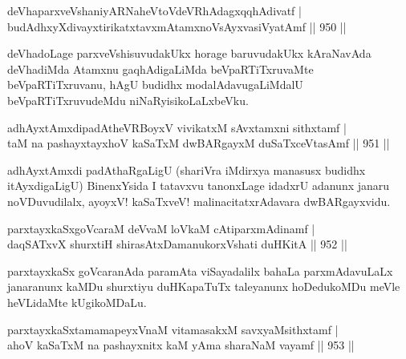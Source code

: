 
\begin{shl}
deVhaparxveVshaniyARNaheVtoVdeVRhAda\footnotemark[1]gxqqhAdivatf | \\
budAdhxyXdivayxtirikatxtavxmAtamxnoV\s sAyxvasiVyatAmf \hfill||  950 ||  
\end{shl}

\begin{artha}
deVhadoLage parxveVshisuvudakUkx horage baruvudakUkx  kAraNavAda deVhadiMda Atamxnu gaqhAdigaLiMda beVpaRTiTxruvaMte beVpaRTiTxruvanu, hAgU budidhx modalAdavugaLiMdalU beVpaRTiTxruvudeMdu niNaRyisikoLaLxbeVku.
\end{artha}


\begin{shl}
adhAyxtAmxdipadAtheVRBoyxV vivikatxM sAvxtamxni sithxtamf | \\
taM na pashayxtayxhoV kaSaTxM dwBARgayxM duSaTxceVtasAmf \hfill||  951 ||  
\end{shl}

\begin{artha}
adhAyxtAmxdi padAthaRgaLigU (shariVra iMdirxya manasusx budidhx itAyxdigaLigU) BinenxYsida I tatavxvu tanonxLage idadxrU adanunx janaru noVDuvudilalx, ayoyxV! kaSaTxveV! malinacitatxrAdavara dwBARgayxvidu.
\end{artha}

\begin{shl}
parxtayxkaSxgoVcaraM deVvaM loVkaM cAtiparxmAdinamf | \\
daqSATxvX shurxtiH shirasAtxDamanukorxVshati duHKitA \hfill||  952 ||  
\end{shl}

\begin{artha}
parxtayxkaSx goVcaranAda paramAta viSayadalilx bahaLa parxmAdavuLaLx janaranunx kaMDu shurxtiyu duHKapaTuTx taleyanunx hoDedukoMDu meVle heVLidaMte kUgikoMDaLu.
\end{artha}


\begin{shl}
parxtayxkaSxtamamapeyxVnaM vitamasakxM savxyaMsithxtamf | \\
ahoV kaSaTxM na pashayxnitx kaM yAma sharaNaM vayamf \hfill||  953 ||  
\end{shl}

